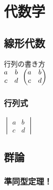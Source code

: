 \documentclass[11pt,a4j]{jreport}
\begin{document}
\chapter{代数学}
\thispagestyle{fancy}
\section{線形代数}
行列の書き方\\
$
\begin{matrix}
    a & b \\
    c & d
\end{matrix}\\
\begin{pmatrix}
    a & b \\
    c & d
\end{pmatrix}\\
$
\subsection{行列式}
$
\begin{vmatrix}
    a & b \\
    c & d
\end{vmatrix}
$

\section{群論}
\subsection{準同型定理！}
\end{document}
